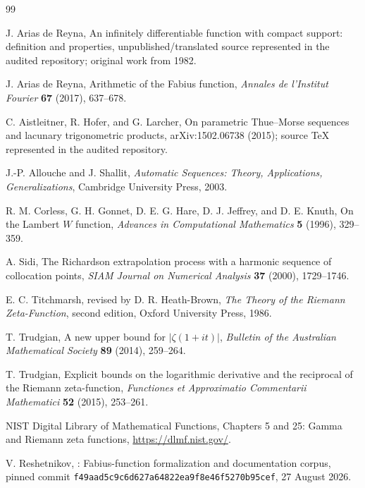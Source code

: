 \documentclass[11pt]{article}
\numberwithin{equation}{section}
\theoremstyle{definition}
\theoremstyle{remark}
\begin{document}
\begin{thebibliography}{99}

J. Arias de Reyna,
\newblock An infinitely differentiable function with compact support: definition and properties,
\newblock unpublished/translated source represented in the audited repository; original work from 1982.

J. Arias de Reyna,
\newblock Arithmetic of the Fabius function,
\newblock \emph{Annales de l'Institut Fourier} \textbf{67} (2017), 637--678.

C. Aistleitner, R. Hofer, and G. Larcher,
\newblock On parametric Thue--Morse sequences and lacunary trigonometric products,
\newblock arXiv:1502.06738 (2015); source TeX represented in the audited repository.

J.-P. Allouche and J. Shallit,
\newblock \emph{Automatic Sequences: Theory, Applications, Generalizations},
\newblock Cambridge University Press, 2003.

R. M. Corless, G. H. Gonnet, D. E. G. Hare, D. J. Jeffrey, and D. E. Knuth,
\newblock On the Lambert $W$ function,
\newblock \emph{Advances in Computational Mathematics} \textbf{5} (1996), 329--359.

A. Sidi,
\newblock The Richardson extrapolation process with a harmonic sequence of collocation points,
\newblock \emph{SIAM Journal on Numerical Analysis} \textbf{37} (2000), 1729--1746.

E. C. Titchmarsh, revised by D. R. Heath-Brown,
\newblock \emph{The Theory of the Riemann Zeta-Function}, second edition,
\newblock Oxford University Press, 1986.

T. Trudgian,
\newblock A new upper bound for $|\zeta(1+it)|$,
\newblock \emph{Bulletin of the Australian Mathematical Society} \textbf{89} (2014), 259--264.

T. Trudgian,
\newblock Explicit bounds on the logarithmic derivative and the reciprocal of the Riemann zeta-function,
\newblock \emph{Functiones et Approximatio Commentarii Mathematici} \textbf{52} (2015), 253--261.

NIST Digital Library of Mathematical Functions,
\newblock Chapters 5 and 25: Gamma and Riemann zeta functions,
\newblock \url{https://dlmf.nist.gov/}.

V. Reshetnikov,
\newblock \repoPartvv{}: Fabius-function formalization and documentation corpus,
\newblock pinned commit \texttt{f49aad5c9c6d627a64822ea9f8e46f5270b95cef}, 27 August 2026.

\end{thebibliography}
\end{document}
